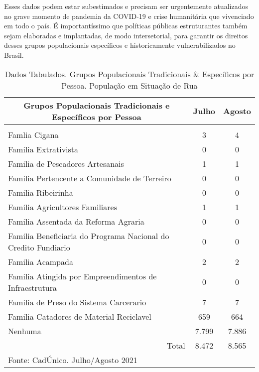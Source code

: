 \documentclass[12pt]{article}
\begin{document}
Esses dados podem estar subestimados e precisam ser urgentemente atualizados no grave momento de pandemia da COVID-19 e crise humanitária que vivenciado em todo o país. É importantíssimo que políticas públicas estruturantes também sejam elaboradas e implantadas, de modo intersetorial, para garantir os direitos desses grupos populacionais específicos e historicamente vulnerabilizados no Brasil.\\ 


\begin{table}[htbp]
  \centering
  \caption{Dados Tabulados. Grupos Populacionais Tradicionais \& Específicos por Pessoa. População em Situação de Rua}
    \begin{tabular}{p{23.5em}rr}
    \hline
    \multicolumn{1}{c}{Grupos Populacionais Tradicionais e Específicos por Pessoa} & \multicolumn{1}{c}{Julho} & \multicolumn{1}{c}{Agosto} \\
    \midrule
    \multicolumn{1}{c}{} &      &  \\
    Famlia Cigana & \multicolumn{1}{c}{3} & \multicolumn{1}{c}{4} \\
    Familia Extrativista & \multicolumn{1}{c}{0} & \multicolumn{1}{c}{0} \\
    Familia de Pescadores Artesanais & \multicolumn{1}{c}{1} & \multicolumn{1}{c}{1} \\
    Familia Pertencente a Comunidade de Terreiro & \multicolumn{1}{c}{0} & \multicolumn{1}{c}{0} \\
    Familia Ribeirinha & \multicolumn{1}{c}{0} & \multicolumn{1}{c}{0} \\
    Familia Agricultores Familiares & \multicolumn{1}{c}{1} & \multicolumn{1}{c}{1} \\
    Familia Assentada da Reforma Agraria & \multicolumn{1}{c}{0} & \multicolumn{1}{c}{0} \\
    Familia Beneficiaria do Programa Nacional do Credito Fundiario & \multicolumn{1}{c}{0} & \multicolumn{1}{c}{0} \\
    Familia Acampada & \multicolumn{1}{c}{2} & \multicolumn{1}{c}{2} \\
    Familia Atingida por Empreendimentos de Infraestrutura & \multicolumn{1}{c}{0} & \multicolumn{1}{c}{0} \\
    Familia de Preso do Sistema Carcerario & \multicolumn{1}{c}{7} & \multicolumn{1}{c}{7} \\
    Familia Catadores de Material Reciclavel & \multicolumn{1}{c}{659} & \multicolumn{1}{c}{664} \\
    Nenhuma & \multicolumn{1}{c}{7.799} & \multicolumn{1}{c}{7.886} \\
    \midrule
    \multicolumn{1}{r}{Total} & \multicolumn{1}{c}{8.472} & \multicolumn{1}{c}{8.565} \\
    \midrule
    Fonte: CadÚnico. Julho/Agosto 2021 &      &  \\
    \end{tabular}%
  \label{tab:tab8}%
\end{table}%
\end{document}
